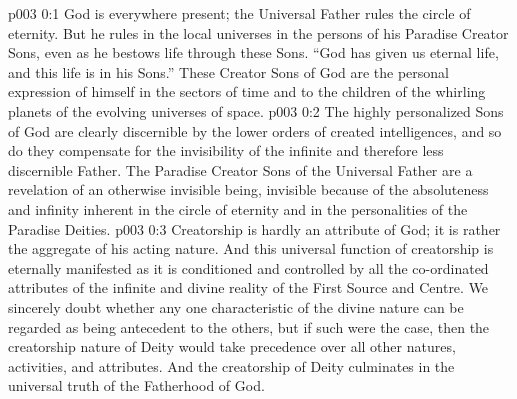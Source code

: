 \author{Divine Counsellor}
\vs p003 0:1 God is everywhere present; the Universal Father rules the circle of eternity. But he rules in the local universes in the persons of his Paradise Creator Sons, even as he bestows life through these Sons. “God has given us eternal life, and this life is in his Sons.” These Creator Sons of God are the personal expression of himself in the sectors of time and to the children of the whirling planets of the evolving universes of space.
\vs p003 0:2 The highly personalized Sons of God are clearly discernible by the lower orders of created intelligences, and so do they compensate for the invisibility of the infinite and therefore less discernible Father. The Paradise Creator Sons of the Universal Father are a revelation of an otherwise invisible being, invisible because of the absoluteness and infinity inherent in the circle of eternity and in the personalities of the Paradise Deities.
\vs p003 0:3 \pc Creatorship is hardly an attribute of God; it is rather the aggregate of his acting nature. And this universal function of creatorship is eternally manifested as it is conditioned and controlled by all the co\hyp{}ordinated attributes of the infinite and divine reality of the First Source and Centre. We sincerely doubt whether any one characteristic of the divine nature can be regarded as being antecedent to the others, but if such were the case, then the creatorship nature of Deity would take precedence over all other natures, activities, and attributes. And the creatorship of Deity culminates in the universal truth of the Fatherhood of God.
